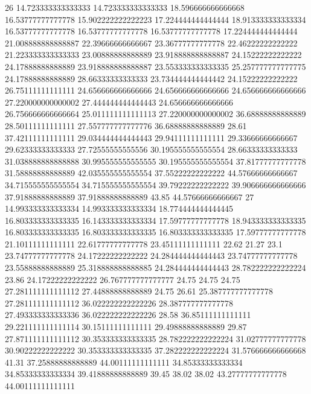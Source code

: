26 14.723333333333333 14.723333333333333 18.596666666666668 16.53777777777778 15.902222222222223 17.224444444444444 18.913333333333334 16.53777777777778 16.53777777777778 16.53777777777778 17.224444444444444 21.008888888888887 22.39666666666667 23.36777777777778 22.46222222222222 21.223333333333333 23.00888888888889 23.918888888888887 24.15222222222222 24.17888888888889 23.918888888888887 23.553333333333335 25.257777777777775 24.17888888888889 28.66333333333333 23.734444444444442 24.15222222222222 26.75111111111111 24.656666666666666 24.656666666666666 24.656666666666666 27.220000000000002 27.444444444444443 24.656666666666666 26.756666666666664 25.011111111111113 27.220000000000002 36.68888888888889 28.50111111111111 27.557777777777776 36.68888888888889 28.61 37.42111111111111 29.034444444444443 29.94111111111111 29.33666666666667 29.62333333333333 27.72555555555556 30.195555555555554 28.66333333333333 31.038888888888888 30.995555555555555 30.195555555555554 37.81777777777778 31.58888888888889 42.035555555555554 37.55222222222222 44.57666666666667 34.715555555555554 34.715555555555554 39.79222222222222 39.906666666666666 37.91888888888889 37.91888888888889 43.85 44.57666666666667
27 14.993333333333334 14.993333333333334 18.774444444444445 16.803333333333335 16.143333333333334 17.59777777777778 18.943333333333335 16.803333333333335 16.803333333333335 16.803333333333335 17.59777777777778 21.10111111111111 22.61777777777778 23.45111111111111 22.62 21.27 23.1 23.74777777777778 24.17222222222222 24.284444444444443 23.74777777777778 23.55888888888889 25.318888888888885 24.284444444444443 28.782222222222224 23.86 24.17222222222222 26.767777777777777 24.75 24.75 24.75 27.281111111111112 27.44888888888889 24.75 26.61 25.387777777777778 27.281111111111112 36.022222222222226 28.387777777777778 27.493333333333336 36.022222222222226 28.58 36.85111111111111 29.221111111111114 30.15111111111111 29.49888888888889 29.87 27.871111111111112 30.353333333333335 28.782222222222224 31.02777777777778 30.90222222222222 30.353333333333335 37.282222222222224 31.576666666666668 41.31 37.25888888888889 44.00111111111111 34.85333333333334 34.85333333333334 39.41888888888889 39.45 38.02 38.02 43.27777777777778 44.00111111111111

